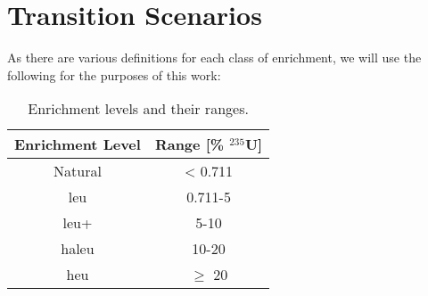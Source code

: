 \section{Transition Scenarios}
\label{sec:transition_scenarios}

As there are various definitions for each class of enrichment, we will use the following for the purposes of this work:

\begin{table}[htbp]
   \centering
   \caption{Enrichment levels and their ranges.}
   \label{tab:enrichment_levels}
   \begin{tabular}{c c}
      \hline
      \textbf{Enrichment Level} & \textbf{Range [\%  $^{235}$U]} \\
      \hline
      Natural & < 0.711 \\
      \gls{leu} & 0.711-5 \\
      \gls{leu+} & 5-10 \\
      \gls{haleu} & 10-20 \\
      \gls{heu} & $\geq$ 20  \\
      \hline
   \end{tabular}
\end{table}



